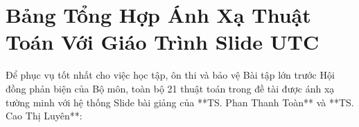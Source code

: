 \documentclass[11pt,a4paper]{article}
\begin{document}
\tableofcontents
\newpage

\section{Bảng Tổng Hợp Ánh Xạ Thuật Toán Với Giáo Trình Slide UTC}
\label{sec:anh_xa_tong_hop}

Để phục vụ tốt nhất cho việc học tập, ôn thi và bảo vệ Bài tập lớn trước Hội đồng phản biện của Bộ môn, toàn bộ 21 thuật toán trong đề tài được ánh xạ tường minh với hệ thống Slide bài giảng của **TS. Phan Thanh Toàn** và **TS. Cao Thị Luyên**:
\end{document}
